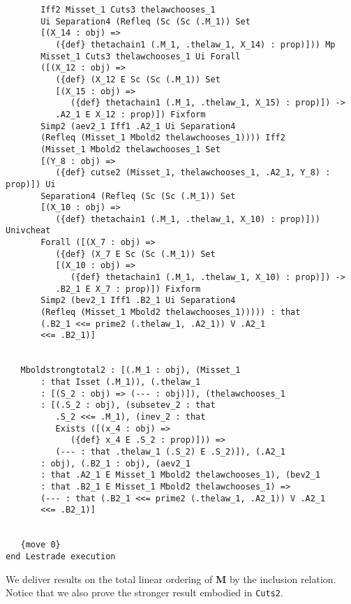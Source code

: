 \documentclass[12pt]{article}
\begin{document}
\begin{verbatim}
       Iff2 Misset_1 Cuts3 thelawchooses_1 
       Ui Separation4 (Refleq (Sc (Sc (.M_1)) Set 
       [(X_14 : obj) => 
          ({def} thetachain1 (.M_1, .thelaw_1, X_14) : prop)])) Mp 
       Misset_1 Cuts3 thelawchooses_1 Ui Forall 
       ([(X_12 : obj) => 
          ({def} (X_12 E Sc (Sc (.M_1)) Set 
          [(X_15 : obj) => 
             ({def} thetachain1 (.M_1, .thelaw_1, X_15) : prop)]) -> 
          .A2_1 E X_12 : prop)]) Fixform 
       Simp2 (aev2_1 Iff1 .A2_1 Ui Separation4 
       (Refleq (Misset_1 Mbold2 thelawchooses_1)))) Iff2 
       (Misset_1 Mbold2 thelawchooses_1 Set 
       [(Y_8 : obj) => 
          ({def} cutse2 (Misset_1, thelawchooses_1, .A2_1, Y_8) : prop)]) Ui 
       Separation4 (Refleq (Sc (Sc (.M_1)) Set 
       [(X_10 : obj) => 
          ({def} thetachain1 (.M_1, .thelaw_1, X_10) : prop)])) Univcheat 
       Forall ([(X_7 : obj) => 
          ({def} (X_7 E Sc (Sc (.M_1)) Set 
          [(X_10 : obj) => 
             ({def} thetachain1 (.M_1, .thelaw_1, X_10) : prop)]) -> 
          .B2_1 E X_7 : prop)]) Fixform 
       Simp2 (bev2_1 Iff1 .B2_1 Ui Separation4 
       (Refleq (Misset_1 Mbold2 thelawchooses_1))))) : that 
       (.B2_1 <<= prime2 (.thelaw_1, .A2_1)) V .A2_1 
       <<= .B2_1)]


   Mboldstrongtotal2 : [(.M_1 : obj), (Misset_1 
       : that Isset (.M_1)), (.thelaw_1 
       : [(S_2 : obj) => (--- : obj)]), (thelawchooses_1 
       : [(.S_2 : obj), (subsetev_2 : that 
          .S_2 <<= .M_1), (inev_2 : that 
          Exists ([(x_4 : obj) => 
             ({def} x_4 E .S_2 : prop)])) => 
          (--- : that .thelaw_1 (.S_2) E .S_2)]), (.A2_1 
       : obj), (.B2_1 : obj), (aev2_1 
       : that .A2_1 E Misset_1 Mbold2 thelawchooses_1), (bev2_1 
       : that .B2_1 E Misset_1 Mbold2 thelawchooses_1) => 
       (--- : that (.B2_1 <<= prime2 (.thelaw_1, .A2_1)) V .A2_1 
       <<= .B2_1)]


   {move 0}
end Lestrade execution
\end{verbatim}

We deliver results on the total linear ordering of {\bf M} by the inclusion relation.  Notice that we also prove the stronger result embodied in {\tt Cuts2}.
\end{document}
